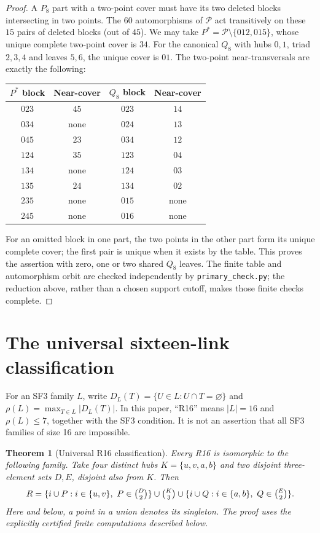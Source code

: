 \documentclass[11pt,a4paper]{article}
\numberwithin{equation}{section}
\newtheorem{theorem}{Theorem}[section]
\theoremstyle{remark}
\newcommand{\Pten}{\mathcal P}
\begin{document}
\begin{proof}
A $ P_8$ part with a two-point cover must have its two deleted
blocks intersecting in two points. The $60$ automorphisms of
$\Pten $ act transitively on these $15$ pairs of deleted blocks
(out of $45$). We may take
$ P^*=\Pten\setminus\{012,015\}$, whose unique complete
two-point cover is $34$. For the canonical $ Q_8$ with hubs
$0,1$, triad $2,3,4$ and leaves $5,6$, the unique cover is $01$.
The two-point near-transversals are exactly the following:
\begin{center}
\begin{tabular}{cccc}
\toprule
$ P^*$ block & Near-cover & $ Q_8$ block & Near-cover\\
\midrule
$023$ & $45$ & $023$ & $14$\\
$034$ & none & $024$ & $13$\\
$045$ & $23$ & $034$ & $12$\\
$124$ & $35$ & $123$ & $04$\\
$134$ & none & $124$ & $03$\\
$135$ & $24$ & $134$ & $02$\\
$235$ & none & $015$ & none\\
$245$ & none & $016$ & none\\
\bottomrule
\end{tabular}
\end{center}
For an omitted block in one part, the two points in the other
part form its unique complete cover; the first pair is unique
when it exists by the table. This proves the assertion with
zero, one or two shared $ Q_8$ leaves. The finite table and
automorphism orbit are checked independently by
\texttt{primary\_check.py}; the reduction above, rather than a
chosen support cutoff, makes those finite checks complete.
\end{proof}

\section{The universal sixteen-link classification}
\label{sec:r16classification}

For an SF3 family $ L $, write $ D_L(T)=\{U\in L:U\cap T=\varnothing\}$ and
$\rho(L)=\max_{T\in L}|D_L(T)|$. In this paper, ``R16'' means
$|L|=16$ and $\rho(L)\le 7$, together with the SF3 condition. It is not an
assertion that all SF3 families of size 16 are impossible.

\begin{theorem}[Universal R16 classification]\label{thm:r16class}
Every R16 is isomorphic to the following family. Take four distinct hubs
$ K=\{u,v,a,b\}$ and two disjoint three-element sets $ D,E $, disjoint also
from $ K $. Then
\[
 R=\{i\cup P:i\in\{u,v\},\ P\in\tbinom D2\}
 \cup\tbinom K3
 \cup\{i\cup Q:i\in\{a,b\},\ Q\in\tbinom E2\}.
\]
Here and below, a point in a union denotes its singleton. The proof uses
the explicitly certified finite computations described below.
\end{theorem}
\end{document}
